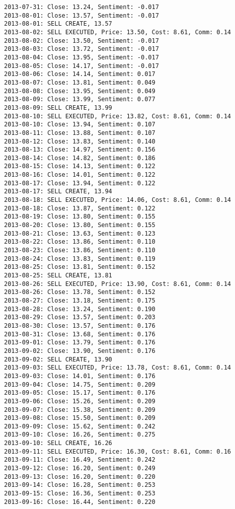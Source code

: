 \documentclass[11pt]{article}
\begin{document}
\begin{Verbatim}[commandchars=\\\{\}]
2013-07-31: Close: 13.24, Sentiment: -0.017
2013-08-01: Close: 13.57, Sentiment: -0.017
2013-08-01: SELL CREATE, 13.57
2013-08-02: SELL EXECUTED, Price: 13.50, Cost: 8.61, Comm: 0.14
2013-08-02: Close: 13.50, Sentiment: -0.017
2013-08-03: Close: 13.72, Sentiment: -0.017
2013-08-04: Close: 13.95, Sentiment: -0.017
2013-08-05: Close: 14.17, Sentiment: -0.017
2013-08-06: Close: 14.14, Sentiment: 0.017
2013-08-07: Close: 13.81, Sentiment: 0.049
2013-08-08: Close: 13.95, Sentiment: 0.049
2013-08-09: Close: 13.99, Sentiment: 0.077
2013-08-09: SELL CREATE, 13.99
2013-08-10: SELL EXECUTED, Price: 13.82, Cost: 8.61, Comm: 0.14
2013-08-10: Close: 13.94, Sentiment: 0.107
2013-08-11: Close: 13.88, Sentiment: 0.107
2013-08-12: Close: 13.83, Sentiment: 0.140
2013-08-13: Close: 14.97, Sentiment: 0.156
2013-08-14: Close: 14.82, Sentiment: 0.186
2013-08-15: Close: 14.13, Sentiment: 0.122
2013-08-16: Close: 14.01, Sentiment: 0.122
2013-08-17: Close: 13.94, Sentiment: 0.122
2013-08-17: SELL CREATE, 13.94
2013-08-18: SELL EXECUTED, Price: 14.06, Cost: 8.61, Comm: 0.14
2013-08-18: Close: 13.87, Sentiment: 0.122
2013-08-19: Close: 13.80, Sentiment: 0.155
2013-08-20: Close: 13.80, Sentiment: 0.155
2013-08-21: Close: 13.63, Sentiment: 0.123
2013-08-22: Close: 13.86, Sentiment: 0.110
2013-08-23: Close: 13.86, Sentiment: 0.110
2013-08-24: Close: 13.83, Sentiment: 0.119
2013-08-25: Close: 13.81, Sentiment: 0.152
2013-08-25: SELL CREATE, 13.81
2013-08-26: SELL EXECUTED, Price: 13.90, Cost: 8.61, Comm: 0.14
2013-08-26: Close: 13.78, Sentiment: 0.152
2013-08-27: Close: 13.18, Sentiment: 0.175
2013-08-28: Close: 13.24, Sentiment: 0.190
2013-08-29: Close: 13.57, Sentiment: 0.203
2013-08-30: Close: 13.57, Sentiment: 0.176
2013-08-31: Close: 13.68, Sentiment: 0.176
2013-09-01: Close: 13.79, Sentiment: 0.176
2013-09-02: Close: 13.90, Sentiment: 0.176
2013-09-02: SELL CREATE, 13.90
2013-09-03: SELL EXECUTED, Price: 13.78, Cost: 8.61, Comm: 0.14
2013-09-03: Close: 14.01, Sentiment: 0.176
2013-09-04: Close: 14.75, Sentiment: 0.209
2013-09-05: Close: 15.17, Sentiment: 0.176
2013-09-06: Close: 15.26, Sentiment: 0.209
2013-09-07: Close: 15.38, Sentiment: 0.209
2013-09-08: Close: 15.50, Sentiment: 0.209
2013-09-09: Close: 15.62, Sentiment: 0.242
2013-09-10: Close: 16.26, Sentiment: 0.275
2013-09-10: SELL CREATE, 16.26
2013-09-11: SELL EXECUTED, Price: 16.30, Cost: 8.61, Comm: 0.16
2013-09-11: Close: 16.49, Sentiment: 0.242
2013-09-12: Close: 16.20, Sentiment: 0.249
2013-09-13: Close: 16.20, Sentiment: 0.220
2013-09-14: Close: 16.28, Sentiment: 0.253
2013-09-15: Close: 16.36, Sentiment: 0.253
2013-09-16: Close: 16.44, Sentiment: 0.220

\end{Verbatim}
\end{document}
